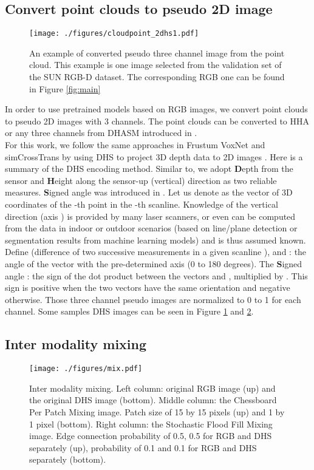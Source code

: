 \documentclass[]{modified_llncs}
\begin{document}
\subsection {Convert point clouds to pseudo 2D image}
\begin{figure}[H]
\begin{center}
\texttt{[image: ./figures/cloudpoint\_2dhs1.pdf]}
\end{center}
    \caption{An example of converted pseudo three channel image from the point cloud. This example is one image selected from the validation set of the SUN RGB-D dataset. The corresponding RGB one can be found in Figure \ref{fig:main}}
\label{fig:pc2dhs}
\end{figure}
In order to use pretrained models based on RGB images, we convert point clouds to pseudo 2D images with 3 channels. The point clouds can be converted to HHA or any three channels from DHASM introduced in \cite{allancnn}.\\

For this work, we follow the same approaches in Frustum VoxNet\cite{Shen_2020_WACV} and simCrossTrans \cite{simCrossTrans_cite} by using DHS to project 3D depth data to 2D images \cite{allancnn}.
Here is a summary of the DHS encoding method. Similar to\cite{GuptaGAM14,allancnn}, we adopt \textbf{D}epth from the sensor and \textbf{H}eight along the sensor-up (vertical) direction as two reliable measures. \textbf{S}igned angle was introduced in \cite{OnlineClassificationStamos}. Let us denote as  the vector of 3D coordinates of the -th point in the -th scanline. Knowledge of the vertical direction (axis ) is provided by many laser scanners, or even can be computed from the data in indoor or outdoor scenarios (based on line/plane detection or segmentation results from machine learning models) and is thus assumed known. Define  (difference of two successive measurements in a given scanline ), and : the angle of the vector  with the pre-determined  axis (0 to 180 degrees). The \textbf{S}igned angle : the sign of the dot product between the vectors  and , multiplied by . This sign is positive when the two vectors have the same orientation and negative otherwise. Those three channel pseudo images are normalized to 0 to 1 for each channel. Some samples DHS images can be seen in Figure \ref{fig:pc2dhs} and \ref{fig:aug}.
\subsection {Inter modality mixing}
\begin{figure}[H]
\begin{center}
\texttt{[image: ./figures/mix.pdf]}
\end{center}
    \caption{Inter modality mixing. Left column: original RGB image (up) and the original DHS image (bottom). Middle column: the Chessboard Per Patch Mixing image.  Patch size of 15 by 15 pixels (up) and 1 by 1 pixel (bottom). Right column: the Stochastic Flood Fill Mixing image. Edge connection probability of 0.5, 0.5 for RGB and DHS separately (up), probability of 0.1 and 0.1 for RGB and DHS separately (bottom).}
\label{fig:aug}
\end{figure}
\end{document}
